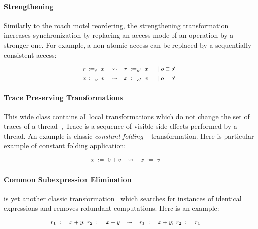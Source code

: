 \paragraph{Strengthening}

Similarly to the roach motel reordering, the strengthening
transformation increases synchronization by 
replacing an access mode of an operation by a stronger one. 
For example, a non-atomic access can be replaced by 
a sequentially consistent access: 
%
\[\def\arraystretch{1.4}\footnotesize
  \begin{array}{cccl} 

      \readInst{o}{r}{x} 
    & \leadsto 
    & \readInst{o'}{r}{x}
    & ~|~ o \sqsubset o' \\ 

      \writeInst{o}{x}{v}
    & \leadsto 
    & \writeInst{o'}{x}{v}
    & ~|~ o \sqsubset o'  \\ 

  \end{array}
\]

\paragraph{Trace Preserving Transformations}

This wide class contains all local transformations 
which do not change the set of traces of a thread~\cite{Sevcik-Aspinall:ECOOP08},
Trace is a sequence of visible side-effects performed by a thread. 
An example is classic \emph{constant folding}%
~\cite{Muchnick:ACDI97, Wegman-Zadeck:TOPLAS91} transformation.
Here is particular example of constant folding application:
%
\[\def\arraystretch{1.4}\footnotesize
  \begin{array}{cccl} 

      \writeInst{}{x}{0 + v} 
    & \leadsto 
    & \writeInst{}{x}{v}
    & \\ 

  \end{array}
\]
  
\paragraph{Common Subexpression Elimination}

\CSE is yet another classic transformation~\cite{Muchnick:ACDI97} 
which searches for instances of identical expressions 
and removes redundant computations. 
Here is an example: 
%
\[\def\arraystretch{1.4}\footnotesize
  \begin{array}{cccl} 

      \readInst{}{r_1}{x + y} \seq \readInst{}{r_2}{x + y} 
    & \leadsto 
    & \readInst{}{r_1}{x + y} \seq \readInst{}{r_2}{r_1}
    & \\ 

  \end{array}
\]

